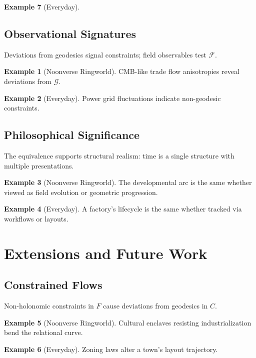 \documentclass[11pt]{article}
\theoremstyle{plain}
\theoremstyle{definition}
\newtheorem{example}{Example}[section]
\begin{document}
\begin{example}[Everyday]
\subsection{Observational Signatures}
Deviations from geodesics signal constraints; field observables test $\mathscr{F}$.

\begin{example}[Noonverse Ringworld]
CMB-like trade flow anisotropies reveal deviations from $\mathcal{G}$.
\end{example}

\begin{example}[Everyday]
Power grid fluctuations indicate non-geodesic constraints.
\end{example}

\subsection{Philosophical Significance}
The equivalence supports structural realism: time is a single structure with multiple presentations.

\begin{example}[Noonverse Ringworld]
The developmental arc is the same whether viewed as field evolution or geometric progression.
\end{example}

\begin{example}[Everyday]
A factory’s lifecycle is the same whether tracked via workflows or layouts.
\end{example}

\section{Extensions and Future Work}

\subsection{Constrained Flows}
Non-holonomic constraints in $F$ cause deviations from geodesics in $C$.

\begin{example}[Noonverse Ringworld]
Cultural enclaves resisting industrialization bend the relational curve.
\end{example}

\begin{example}[Everyday]
Zoning laws alter a town’s layout trajectory.
\end{example}


\end{example}
\end{document}
